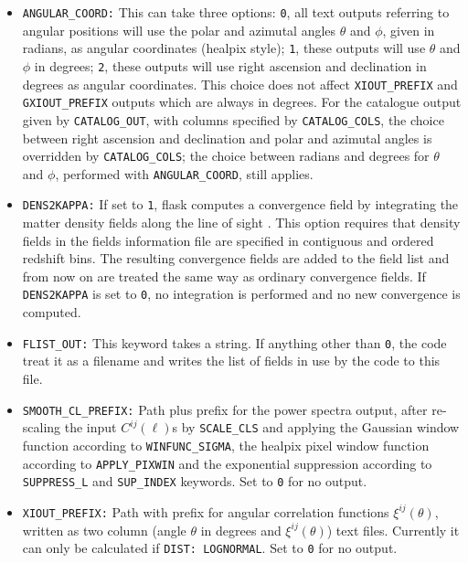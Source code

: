 \documentclass[12pt]{book} %
\begin{document}
\begin{itemize}
\item {\tt ANGULAR\_COORD:} This can take three options: {\tt 0}, all text outputs referring 
  to angular positions will use the polar and azimutal angles $\theta$ and $\phi$, given in radians, 
  as angular coordinates ({\sc healpix} style); {\tt 1}, these outputs will use $\theta$ and $\phi$ 
  in degrees; {\tt 2}, these outputs will use right ascension and declination in degrees as 
  angular coordinates. This choice does not affect {\tt XIOUT\_PREFIX} and {\tt GXIOUT\_PREFIX} 
  outputs which are always in degrees. For the catalogue output given by {\tt CATALOG\_OUT}, 
  with columns specified by {\tt CATALOG\_COLS}, the choice between right ascension and declination and 
  polar and azimutal angles is overridden by {\tt CATALOG\_COLS}; the choice between radians and degrees 
  for $\theta$ and $\phi$, performed with {\tt ANGULAR\_COORD}, still applies.

\item {\tt DENS2KAPPA:} If set to {\tt 1}, {\sc flask} computes a convergence field by integrating 
  the matter density fields along the line of sight \citep[see][for details]{Xavier16mn}. This 
  option requires that density fields in the fields information file are specified in contiguous 
  and ordered redshift bins. The resulting convergence fields are added to the field list and from 
  now on are treated the same way as ordinary convergence fields. If {\tt DENS2KAPPA} is set to {\tt 0}, 
  no integration is performed and no new convergence is computed. 

\item {\tt FLIST\_OUT:} This keyword takes a string. If anything other than {\tt 0}, the code 
  treat it as a filename and writes the list of fields in use by the code to this file. 

\item {\tt SMOOTH\_CL\_PREFIX:} Path plus prefix for the power spectra output, after re-scaling 
  the input $C^{ij}(\ell)$s by {\tt SCALE\_CLS} and applying the Gaussian window function according to 
  {\tt WINFUNC\_SIGMA}, the {\sc healpix} pixel window function according to {\tt APPLY\_PIXWIN} 
  and the exponential suppression according to {\tt SUPPRESS\_L} and {\tt SUP\_INDEX} 
  keywords. Set to {\tt 0} for no output.

\item {\tt XIOUT\_PREFIX:} Path with prefix for angular correlation functions $\xi^{ij}(\theta)$, 
  written as two column (angle $\theta$ in degrees and $\xi^{ij}(\theta)$) text files. 
  Currently it can only be calculated if {\tt DIST: LOGNORMAL}. Set to {\tt 0} for no output.


\end{itemize}
\end{document}
